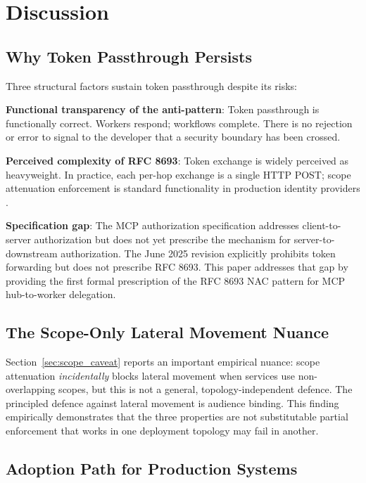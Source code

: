 \documentclass[journal]{IEEEtran}
\begin{document}
\section{Discussion}
\label{sec:discussion}

\subsection{Why Token Passthrough Persists}

Three structural factors sustain token passthrough despite its risks:

\textbf{Functional transparency of the anti-pattern}: Token passthrough is
functionally correct. Workers respond; workflows complete. There is no rejection
or error to signal to the developer that a security boundary has been crossed.

\textbf{Perceived complexity of RFC 8693}: Token exchange is widely perceived
as heavyweight. In practice, each per-hop exchange is a single HTTP POST;
scope attenuation enforcement is standard functionality in production identity
providers \cite{rfc8693_deploy}.

\textbf{Specification gap}: The MCP authorization specification
\cite{mcp_spec_2025} addresses client-to-server authorization but does not yet
prescribe the mechanism for server-to-downstream authorization. The June 2025
revision explicitly prohibits token forwarding but does not prescribe RFC 8693.
This paper addresses that gap by providing the first formal prescription of the
RFC 8693 NAC pattern for MCP hub-to-worker delegation.

\subsection{The Scope-Only Lateral Movement Nuance}

Section~\ref{sec:scope_caveat} reports an important empirical nuance: scope
attenuation \textit{incidentally} blocks lateral movement when services use
non-overlapping scopes, but this is not a general, topology-independent defence.
The principled defence against lateral movement is audience binding. This
finding empirically demonstrates that the three properties are not
substitutable partial enforcement that works in one deployment topology may fail
in another.

\subsection{Adoption Path for Production Systems}
\end{document}
